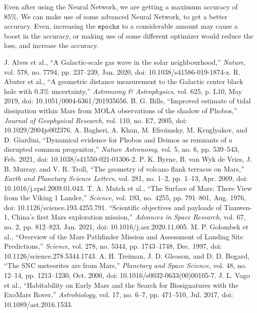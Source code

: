 \documentclass[conference]{IEEEtran}
\begin{document}
Even after using the Neural Network, we are getting a maximum accuracy of 85\%. We can make use of some advanced Neural Network, to get a better accuracy. Even, increasing the $\mathtt{epochs}$ to a considerable amount may cause a boost in the accuracy, or making use of some different optimizer would reduce the loss, and increase the accuracy. 
\begin{thebibliography}{00}
 J. Alves et al., “A Galactic-scale gas wave in the solar neighbourhood,” \textit{Nature}, vol. 578, no. 7794, pp. 237–239, Jan. 2020, doi: 10.1038/s41586-019-1874-z.
 R. Abuter et al., “A geometric distance measurement to the Galactic center black hole with 0.3\% uncertainty,” \textit{Astronomy \& Astrophysics}, vol. 625, p. L10, May 2019, doi: 10.1051/0004-6361/201935656.
 B. G. Bills, “Improved estimate of tidal dissipation within Mars from MOLA observations of the shadow of Phobos,” \textit{Journal of Geophysical Research}, vol. 110, no. E7, 2005, doi: 10.1029/2004je002376.
 A. Bagheri, A. Khan, M. Efroimsky, M. Kruglyakov, and D. Giardini, “Dynamical evidence for Phobos and Deimos as remnants of a disrupted common progenitor,” \textit{Nature Astronomy}, vol. 5, no. 6, pp. 539–543, Feb. 2021, doi: 10.1038/s41550-021-01306-2.
 P. K. Byrne, B. van Wyk de Vries, J. B. Murray, and V. R. Troll, “The geometry of volcano flank terraces on Mars,” \textit{Earth and Planetary Science Letters}, vol. 281, no. 1–2, pp. 1–13, Apr. 2009, doi: 10.1016/j.epsl.2009.01.043.
 T. A. Mutch et al., “The Surface of Mars: There View from the Viking 1 Lander,” \textit{Science}, vol. 193, no. 4255, pp. 791–801, Aug. 1976, doi: 10.1126/science.193.4255.791.
 “Scientific objectives and payloads of Tianwen-1, China’s first Mars exploration mission,” \textit{Advances in Space Research}, vol. 67, no. 2, pp. 812–823, Jan. 2021, doi: 10.1016/j.asr.2020.11.005.
 M. P. Golombek et al., “Overview of the Mars Pathfinder Mission and Assessment of Landing Site Predictions,” \textit{Science}, vol. 278, no. 5344, pp. 1743–1748, Dec. 1997, doi: 10.1126/science.278.5344.1743.
 A. H. Treiman, J. D. Gleason, and D. D. Bogard, “The SNC meteorites are from Mars,” \textit{Planetary and Space Science}, vol. 48, no. 12–14, pp. 1213–1230, Oct. 2000, doi: 10.1016/s0032-0633(00)00105-7.
 J. L. Vago et al., “Habitability on Early Mars and the Search for Biosignatures with the ExoMars Rover,” \textit{Astrobiology}, vol. 17, no. 6–7, pp. 471–510, Jul. 2017, doi: 10.1089/ast.2016.1533.

\end{thebibliography}
\end{document}

